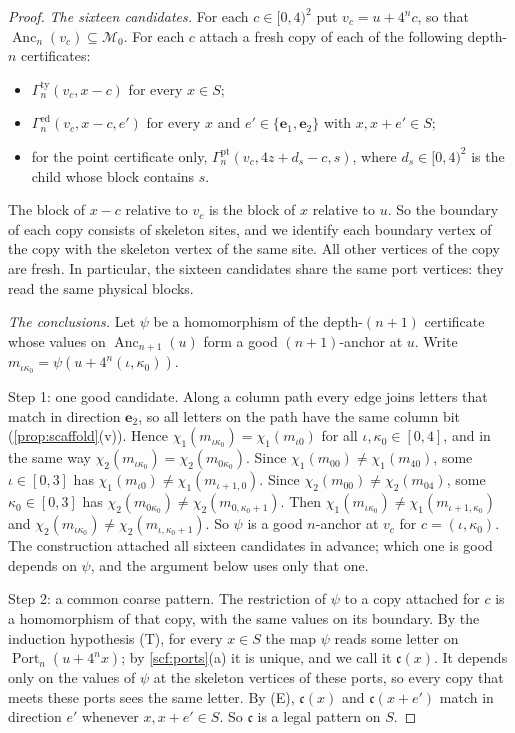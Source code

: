 \begin{proof}
\emph{The sixteen candidates.} For each $c\in[0,4)^2$ put $v_c=u+4^nc$, so that $\operatorname{Anc}_n(v_c)\subseteq\mathcal M_0$. For each $c$ attach a fresh copy of each of the following depth-$n$ certificates:
\begin{itemize}
\item $\Gamma^{\mathrm{ty}}_n(v_c,x-c)$ for every $x\in S$;
\item $\Gamma^{\mathrm{ed}}_n(v_c,x-c,e')$ for every $x$ and $e'\in\{\mathbf e_1,\mathbf e_2\}$ with $x,x+e'\in S$;
\item for the point certificate only, $\Gamma^{\mathrm{pt}}_n(v_c,4z+d_s-c,s)$, where $d_s\in[0,4)^2$ is the child whose block contains $s$.
\end{itemize}
The block of $x-c$ relative to $v_c$ is the block of $x$ relative to $u$. So the boundary of each copy consists of skeleton sites, and we identify each boundary vertex of the copy with the skeleton vertex of the same site. All other vertices of the copy are fresh. In particular, the sixteen candidates share the same port vertices: they read the same physical blocks.

\emph{The conclusions.} Let $\psi$ be a homomorphism of the depth-$(n+1)$ certificate whose values on $\operatorname{Anc}_{n+1}(u)$ form a good $(n+1)$-anchor at $u$. Write $m_{\iota\kappa_0}=\psi(u+4^n(\iota,\kappa_0))$.

Step 1: one good candidate. Along a column path every edge joins letters that match in direction $\mathbf e_2$, so all letters on the path have the same column bit (\cref{prop:scaffold}(v)). Hence $\chi_1(m_{\iota\kappa_0})=\chi_1(m_{\iota0})$ for all $\iota,\kappa_0\in[0,4]$, and in the same way $\chi_2(m_{\iota\kappa_0})=\chi_2(m_{0\kappa_0})$. Since $\chi_1(m_{00})\ne\chi_1(m_{40})$, some $\iota\in[0,3]$ has $\chi_1(m_{\iota0})\ne\chi_1(m_{\iota+1,0})$. Since $\chi_2(m_{00})\ne\chi_2(m_{04})$, some $\kappa_0\in[0,3]$ has $\chi_2(m_{0\kappa_0})\ne\chi_2(m_{0,\kappa_0+1})$. Then $\chi_1(m_{\iota\kappa_0})\ne\chi_1(m_{\iota+1,\kappa_0})$ and $\chi_2(m_{\iota\kappa_0})\ne\chi_2(m_{\iota,\kappa_0+1})$. So $\psi$ is a good $n$-anchor at $v_c$ for $c=(\iota,\kappa_0)$. The construction attached all sixteen candidates in advance; which one is good depends on $\psi$, and the argument below uses only that one.

Step 2: a common coarse pattern. The restriction of $\psi$ to a copy attached for $c$ is a homomorphism of that copy, with the same values on its boundary. By the induction hypothesis (T), for every $x\in S$ the map $\psi$ reads some letter on $\operatorname{Port}_n(u+4^nx)$; by \cref{scf:ports}(a) it is unique, and we call it $\mathfrak c(x)$. It depends only on the values of $\psi$ at the skeleton vertices of these ports, so every copy that meets these ports sees the same letter. By (E), $\mathfrak c(x)$ and $\mathfrak c(x+e')$ match in direction $e'$ whenever $x,x+e'\in S$. So $\mathfrak c$ is a legal pattern on $S$.


\end{proof}
